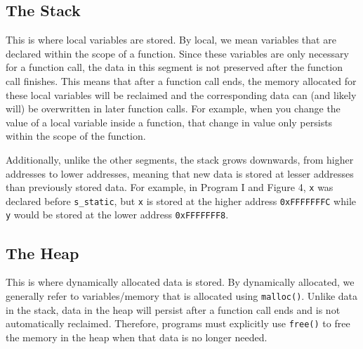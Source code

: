\documentclass{article}
\begin{document}
\subsection{The Stack}
This is where local variables are stored. By local, we mean variables that are declared within the scope of a function. Since these variables are only necessary for a function call, the data in this segment is not preserved after the function call finishes. This means that after a function call ends, the memory allocated for these local variables  will be reclaimed and the corresponding data can (and likely will) be overwritten in later function calls. For example, when you change the value of a local variable inside a function, that change in value only persists within the scope of the function. 

Additionally, unlike the other segments, the stack grows downwards, from higher addresses to lower addresses, meaning that new data is stored at lesser addresses than previously stored data.  For example, in Program I and Figure 4, \texttt{x} was declared before \texttt{s\_static}, but \texttt{x} is stored at the higher address \texttt{0xFFFFFFFC} while \texttt{y} would be stored at the lower address \texttt{0xFFFFFFF8}. 

\subsection{The Heap}
This is where dynamically allocated data is stored. By dynamically allocated, we generally refer to variables/memory that is allocated using \texttt{malloc()}. Unlike data in the stack, data in the heap will persist after a function call ends and is not automatically reclaimed. Therefore, programs must explicitly use \texttt{free()} to free the memory in the heap when that data is no longer needed. 
\end{document}
